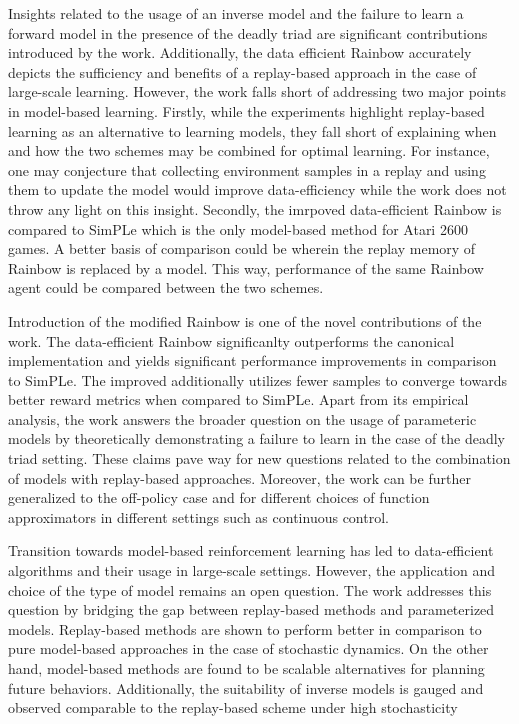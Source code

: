 \documentclass[10pt,letterpaper]{article}
\begin{document}
Insights related to the usage of an inverse model and the failure to learn a forward model in the presence of the deadly triad are significant contributions introduced by the work. Additionally, the data efficient Rainbow accurately depicts the sufficiency and benefits of a replay-based approach in the case of large-scale learning. However, the work falls short of addressing two major points in model-based learning. Firstly, while the experiments highlight replay-based learning as an alternative to learning models, they fall short of explaining when and how the two schemes may be combined for optimal learning. For instance, one may conjecture that collecting environment samples in a replay and using them to update the model would improve data-efficiency while the work does not throw any light on this insight. Secondly, the imrpoved data-efficient Rainbow is compared to SimPLe which is the only model-based method for Atari 2600 games. A better basis of comparison could be wherein the replay memory of Rainbow is replaced by a model. This way, performance of the same Rainbow agent could be compared between the two schemes. 

Introduction of the modified Rainbow is one of the novel contributions of the work. The data-efficient Rainbow significanlty outperforms the canonical implementation and yields significant performance improvements in comparison to SimPLe. The improved additionally utilizes fewer samples to converge towards better reward metrics when compared to SimPLe. Apart from its empirical analysis, the work answers the broader question on the usage of parameteric models by theoretically demonstrating a failure to learn in the case of the deadly triad setting. These claims pave way for new questions related to the combination of models with replay-based approaches. Moreover, the work can be further generalized to the off-policy case and for different choices of function approximators in different settings such as continuous control. 

Transition towards model-based reinforcement learning has led to data-efficient algorithms and their usage in large-scale settings. However, the application and choice of the type of model remains an open question. The work addresses this question by bridging the gap between replay-based methods and parameterized models. Replay-based methods are shown to perform better in comparison to pure model-based approaches in the case of stochastic dynamics. On the other hand, model-based methods are found to be scalable alternatives for planning future behaviors. Additionally, the suitability of inverse models is gauged and observed comparable to the replay-based scheme under high stochasticity  
\end{document}
